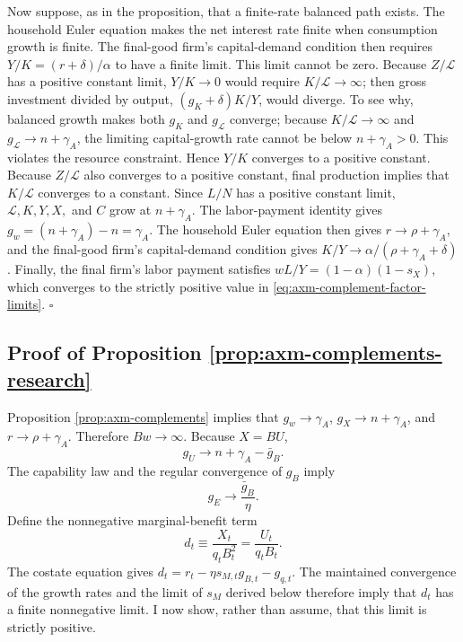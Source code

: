 Now suppose, as in the proposition, that a finite-rate balanced path exists.
The household Euler equation makes the net interest rate finite when consumption
growth is finite. The final-good firm's capital-demand condition then requires
\(Y/K=(r+\delta)/\alpha\) to have a finite limit. This limit cannot be zero.
Because \(Z/\mathcal L\) has a positive constant limit,
\(Y/K\to0\) would require \(K/\mathcal L\to\infty\); then gross investment divided by
output, \((g_K+\delta)K/Y\), would diverge. To see why, balanced growth makes
both \(g_K\) and \(g_{\mathcal L}\) converge; because
\(K/\mathcal L\to\infty\) and \(g_{\mathcal L}\to n+\gamma_A\),
the limiting capital-growth rate cannot be below \(n+\gamma_A>0\). This violates the
resource constraint. Hence
\(Y/K\) converges to a positive constant.
Because \(Z/\mathcal L\) also converges to a positive constant, final production implies
that \(K/\mathcal L\) converges to a constant. Since \(L/N\) has a positive
constant limit, \(\mathcal L,K,Y,X,\) and \(C\) grow at
\(n+\gamma_A\). The labor-payment identity gives
\(g_w=(n+\gamma_A)-n=\gamma_A\). The household Euler equation then gives
\(r\to\rho+\gamma_A\), and the final-good firm's capital-demand condition gives
\(K/Y\to\alpha/(\rho+\gamma_A+\delta)\).
Finally, the final firm's labor payment satisfies
\(wL/Y=(1-\alpha)(1-s_X)\), which converges to the strictly positive value in
\eqref{eq:axm-complement-factor-limits}. \(\square\)

\subsection{Proof of Proposition \ref{prop:axm-complements-research}}

Proposition \ref{prop:axm-complements} implies that
\(g_w\to\gamma_A\), \(g_X\to n+\gamma_A\), and
\(r\to\rho+\gamma_A\). Therefore \(Bw\to\infty\).
Because \(X=BU\),
\begin{equation}
 g_U\to n+\gamma_A-\bar g_B.
 \label{eq:axm-proof-complement-gu}
\end{equation}
The capability law and the regular convergence of \(g_B\) imply
\begin{equation}
 g_E\to\frac{\bar g_B}{\eta}.
 \label{eq:axm-proof-complement-ge}
\end{equation}
Define the nonnegative marginal-benefit term
\begin{equation}
 d_t\equiv\frac{X_t}{q_tB_t^2}=\frac{U_t}{q_tB_t}.
 \label{eq:axm-proof-complement-d}
\end{equation}
The costate equation gives
\(d_t=r_t-\eta s_{M,t}g_{B,t}-g_{q,t}\). The maintained convergence of the
growth rates and the limit of \(s_M\) derived below therefore imply that \(d_t\)
has a finite nonnegative limit. I now show, rather than assume, that this limit
is strictly positive.

